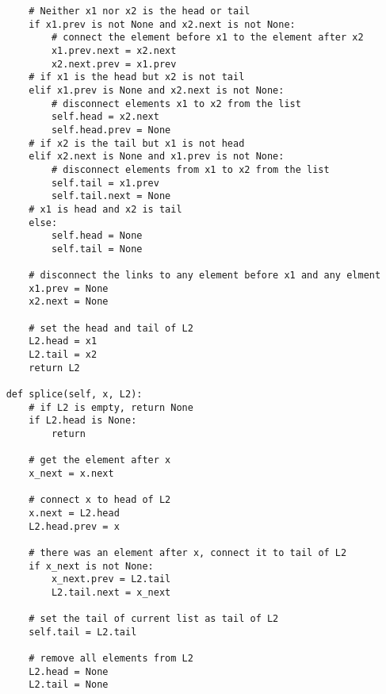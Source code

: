 \documentclass[12pt,twoside]{article}
\begin{document}
\begin{problems}
\begin{problemparts}
\begin{lstlisting}
        # Neither x1 nor x2 is the head or tail
        if x1.prev is not None and x2.next is not None:
            # connect the element before x1 to the element after x2
            x1.prev.next = x2.next
            x2.next.prev = x1.prev
        # if x1 is the head but x2 is not tail
        elif x1.prev is None and x2.next is not None:
            # disconnect elements x1 to x2 from the list
            self.head = x2.next
            self.head.prev = None
        # if x2 is the tail but x1 is not head
        elif x2.next is None and x1.prev is not None:
            # disconnect elements from x1 to x2 from the list
            self.tail = x1.prev
            self.tail.next = None
        # x1 is head and x2 is tail
        else:
            self.head = None
            self.tail = None

        # disconnect the links to any element before x1 and any elment
        x1.prev = None
        x2.next = None

        # set the head and tail of L2
        L2.head = x1
        L2.tail = x2
        return L2

    def splice(self, x, L2):
        # if L2 is empty, return None
        if L2.head is None:
            return
        
        # get the element after x
        x_next = x.next

        # connect x to head of L2
        x.next = L2.head
        L2.head.prev = x

        # there was an element after x, connect it to tail of L2
        if x_next is not None:
            x_next.prev = L2.tail
            L2.tail.next = x_next

        # set the tail of current list as tail of L2
        self.tail = L2.tail

        # remove all elements from L2
        L2.head = None
        L2.tail = None
\end{lstlisting}
\end{problemparts}

\end{problems}
\end{document}
